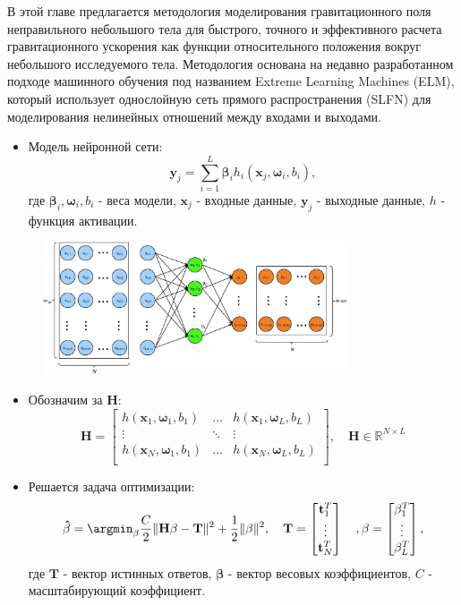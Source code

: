 В этой главе предлагается методология моделирования гравитационного поля неправильного небольшого тела для быстрого, точного и эффективного расчета гравитационного ускорения как функции относительного положения вокруг небольшого исследуемого тела.
Методология основана на недавно разработанном подходе машинного обучения под названием Extreme Learning Machines (ELM), который использует однослойную сеть прямого распространения (SLFN) для моделирования нелинейных отношений между входами и выходами.
\begin{itemize}
\item Модель нейронной сети:
\[
    \mathbf{y}_j = \sum_{i=1}^L \mathbf{\beta}_i
        h_i(\mathbf{x}_j,\mathbf{\omega}_i,{b}_i),
\]
где $\mathbf{\beta}_i,\mathbf{\omega}_i,{b}_i$ - веса модели, $\mathbf{x}_j$ - входные данные, $\mathbf{y}_j$ - выходные данные, $h$ - функция активации.
\end{itemize}
\begin{figure}[h]
    \centering
    \includegraphics[width=0.8\textwidth]{chapters/tikhonov_s2/images/net.jpg}
    \label{fg:1}
\end{figure}
\begin{itemize}
\item Обозначим за $\mathbf{H}$:
\[
\mathbf{H} = 
\begin{bmatrix} 
	h(\mathbf{x}_1,\mathbf{\omega}_1,{b}_1) & \ldots & h(\mathbf{x}_1,\mathbf{\omega}_L,{b}_L)\\
	\vdots & \ddots & \vdots \\
	h(\mathbf{x}_N,\mathbf{\omega}_1,{b}_1) & \ldots & h(\mathbf{x}_N,\mathbf{\omega}_L,{b}_L)\\
\end{bmatrix},
\quad
\mathbf{H} \in \mathbb{R}^{N \times L}
\]

\item Решается задача оптимизации:
\[
   \mathbf{\hat{\beta}} = \argmin_{\beta}\frac{C}{2}\|\mathbf{H}\beta - \mathbf{T}\|^2 + \frac{1}{2}\|\beta\|^2,
   \quad
   \mathbf{T} = 
    \begin{bmatrix} 
    	\mathbf{t}_1^T\\
    	\vdots \\
    	\mathbf{t}_N^T\\
    \end{bmatrix}
   \quad,
   \mathbf{\beta} = 
    \begin{bmatrix} 
    	\mathbf{\beta}_1^T\\
    	\vdots \\
    	\mathbf{\beta}_L^T\\
    \end{bmatrix},
\]
где $\mathbf{T}$ - вектор истинных ответов, $\mathbf{\beta}$ - вектор весовых коэффициентов, $C$ - масштабирующий коэффициент.
\end{itemize}
